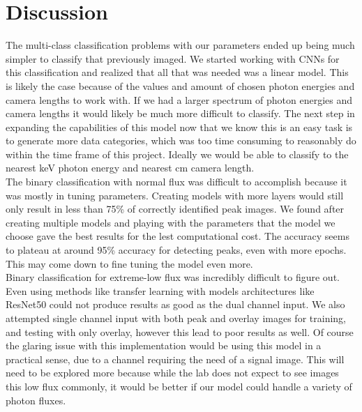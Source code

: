 \documentclass[12pt]{article}
\begin{document}
\section{Discussion}

The multi-class classification problems with our parameters ended up being much simpler to classify that previously imaged. We started working with CNNs for this classification and realized that all that was needed was a linear model. This is likely the case because of the values and amount of chosen photon energies and camera lengths to work with. If we had a larger spectrum of photon energies and camera lengths it would likely be much more difficult to classify. The next step in expanding the capabilities of this model now that we know this is an easy task is to generate more data categories, which was too time consuming to reasonably do within the time frame of this project. Ideally we would be able to classify to the nearest keV photon energy and nearest cm camera length.\\

The binary classification with normal flux was difficult to accomplish because it was mostly in tuning parameters. Creating models with more layers would still only result in less than 75\% of correctly identified peak images. We  found after creating multiple models and playing with the parameters that the model we choose gave the best results for the lest computational cost. The accuracy seems to plateau at around 95\% accuracy for detecting peaks, even with more epochs. This may come down to fine tuning the model even more.\\

Binary classification for extreme-low flux was incredibly difficult to figure out. Even using methods like transfer learning with models architectures like ResNet50 could not produce results as good as the dual channel input. We also attempted single channel input with both peak and overlay images for training, and testing with only overlay, however this lead to poor results as well. Of course the glaring issue with this implementation would be using this model in a practical sense, due to a channel requiring the need of a signal image. This will need to be explored more because while the lab does not expect to see images this low flux commonly, it would be better if our model could handle a variety of photon fluxes.\\
\end{document}
